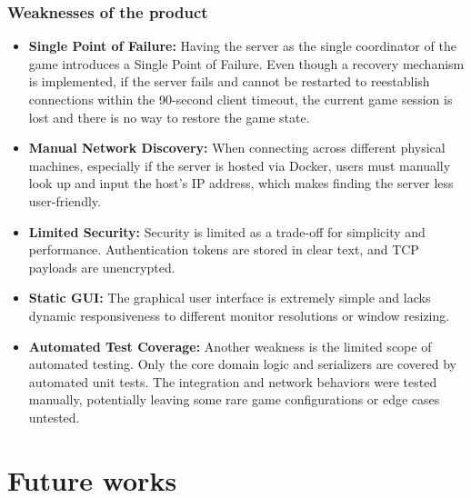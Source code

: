 \documentclass{scrartcl}
\begin{document}
\subsubsection*{Weaknesses of the product}
\begin{itemize}
    \item \textbf{Single Point of Failure:} Having the server as the single coordinator of the game introduces a Single Point of Failure.
    Even though a recovery mechanism is implemented, if the server fails and cannot be restarted to reestablish connections
    within the 90-second client timeout, the current game session is lost and there is no way to restore the game state.
    \item \textbf{Manual Network Discovery:} When connecting across different physical machines,
    especially if the server is hosted via Docker, users must manually look up and input the host's IP address,
    which makes finding the server less user-friendly.
    \item \textbf{Limited Security:} Security is limited as a trade-off for simplicity and performance.
    Authentication tokens are stored in clear text, and TCP payloads are unencrypted.
    \item \textbf{Static GUI:} The graphical user interface is extremely simple and lacks dynamic responsiveness to different monitor resolutions or window resizing.
    \item \textbf{Automated Test Coverage:} Another weakness is the limited scope of automated testing.
    Only the core domain logic and serializers are covered by automated unit tests.
    The integration and network behaviors were tested manually, potentially leaving some rare game configurations or edge cases untested.
\end{itemize}

\section{Future works}\label{future-works}
\end{document}
